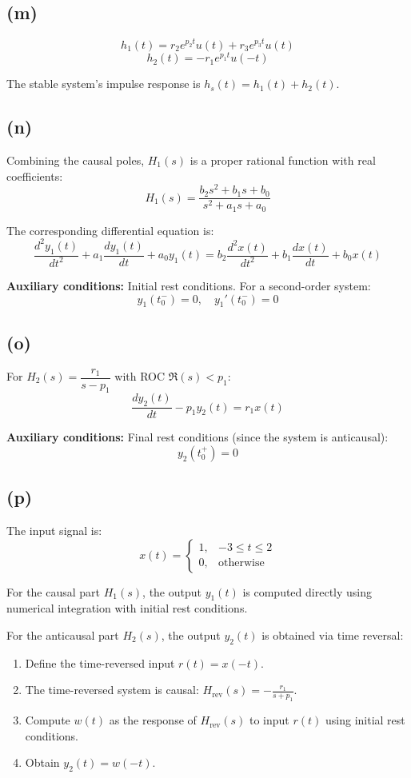 \documentclass[12pt]{article}
\begin{document}
\subsection*{(m)}

\[
h_1(t) = r_2 e^{p_2 t} u(t) + r_3 e^{p_3 t} u(t)
\]
\[
h_2(t) = -r_1 e^{p_1 t} u(-t)
\]

The stable system's impulse response is $h_s(t) = h_1(t) + h_2(t)$.

\subsection*{(n)}
Combining the causal poles, $H_1(s)$ is a proper rational function with real coefficients:
\[
H_1(s) = \frac{b_2 s^2 + b_1 s + b_0}{s^2 + a_1 s + a_0}
\]

The corresponding differential equation is:
\[
\frac{d^2 y_1(t)}{dt^2} + a_1 \frac{d y_1(t)}{dt} + a_0 y_1(t) = b_2 \frac{d^2 x(t)}{dt^2} + b_1 \frac{d x(t)}{dt} + b_0 x(t)
\]

\textbf{Auxiliary conditions:} Initial rest conditions. For a second-order system:
\[
y_1(t_0^-) = 0,\quad y_1'(t_0^-) = 0
\]

\subsection*{(o)}

For $H_2(s) = \dfrac{r_1}{s - p_1}$ with ROC $\Re(s) < p_1$:
\[
\frac{d y_2(t)}{dt} - p_1 y_2(t) = r_1 x(t)
\]

\textbf{Auxiliary conditions:} Final rest conditions (since the system is anticausal):
\[
y_2(t_0^+) = 0
\]

\subsection*{(p)}

The input signal is:
\[
x(t) = \begin{cases}
1, & -3 \leq t \leq 2 \\
0, & \text{otherwise}
\end{cases}
\]

For the causal part $H_1(s)$, the output $y_1(t)$ is computed directly using numerical integration with initial rest conditions.

For the anticausal part $H_2(s)$, the output $y_2(t)$ is obtained via time reversal:
\begin{enumerate}
    \item Define the time-reversed input $r(t) = x(-t)$.
    \item The time-reversed system is causal: $\displaystyle H_{\text{rev}}(s) = -\frac{r_1}{s + p_1}$.
    \item Compute $w(t)$ as the response of $H_{\text{rev}}(s)$ to input $r(t)$ using initial rest conditions.
    \item Obtain $y_2(t) = w(-t)$.
\end{enumerate}
\end{document}
